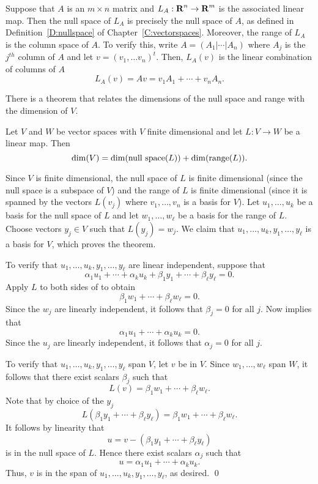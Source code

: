 Suppose that $A$ is an $m\times n$ matrix and $L_A:\mbox{$\bf{R}$}^n\to\mbox{$\bf{R}$}^m$ is the
associated linear map.  Then the null space of $L_A$ is precisely the null
space of $A$, as defined in Definition~\ref{D:nullspace} of 
Chapter~\ref{C:vectorspaces}.  Moreover, the range of $L_A$ is the column 
space of $A$.  To verify this, write $A=(A_1|\cdots|A_n)$ where $A_j$ is the 
$j^{th}$ column of $A$ and let $v=(v_1,\ldots v_n)^t$.  Then, $L_A(v)$ is the 
linear combination of columns of $A$
\[
L_A(v)=Av = v_1A_1+\cdots+v_nA_n.
\]

There is a theorem that relates the dimensions of the null space and range
with the dimension of $V$.
\begin{thm}  \label{T:nsr}
Let $V$ and $W$ be vector spaces with $V$ finite dimensional and let
$L:V\to W$ be a linear map.  Then
\[
\dim(V) = \dim(\mbox{\rm null space}(L)) + \dim({\rm range}(L)).
\] 
\end{thm}

\proof   Since $V$ is finite dimensional, the null space of $L$ is finite 
dimensional (since the null space is a subspace of $V$) and the range of $L$ 
is finite dimensional (since it is spanned by the vectors $L(v_j)$ where 
$v_1,\ldots,v_n$ is a basis for $V$).  Let $u_1,\ldots,u_k$ be a basis for 
the null space of $L$ and let $w_1,\ldots,w_\ell$ be a basis for the range of
$L$.   Choose vectors $y_j\in V$ such that $L(y_j)=w_j$.  We claim that
$u_1,\ldots,u_k,y_1,\ldots,y_\ell$ is a basis for $V$, which proves the
theorem.

To verify that $u_1,\ldots,u_k,y_1,\ldots,y_\ell$ are linear independent,
suppose that
\begin{equation}  \label{E:uy}
\alpha_1u_1+\cdots+\alpha_ku_k+\beta_1y_1+\cdots+\beta_\ell y_\ell = 0.
\end{equation}
Apply $L$ to both sides of  to obtain
\[
\beta_1w_1+\cdots+\beta_\ell w_\ell = 0.
\]
Since the $w_j$ are linearly independent, it follows that $\beta_j=0$ for all
$j$.  Now   implies that
\[
\alpha_1u_1+\cdots+\alpha_ku_k = 0.
\]
Since the $u_j$ are linearly independent, it follows that $\alpha_j=0$ for
all $j$.

To verify that $u_1,\ldots,u_k,y_1,\ldots,y_\ell$ span $V$, let $v$ be in
$V$.  Since $w_1,\ldots,w_\ell$ span $W$, it follows that there exist scalars
$\beta_j$ such that
\[
L(v) = \beta_1w_1+\cdots+\beta_\ell w_\ell.
\]
Note that by choice of the $y_j$
\[
L(\beta_1y_1+\cdots+\beta_\ell y_\ell) = \beta_1w_1+\cdots+\beta_\ell w_\ell.
\]
It follows by linearity that
\[
u = v - (\beta_1y_1+\cdots+\beta_\ell y_\ell)
\]
is in the null space of $L$.  Hence there exist scalars $\alpha_j$ such that
\[
u = \alpha_1u_1+\cdots+\alpha_ku_k.
\]
Thus, $v$ is in the span of $u_1,\ldots,u_k,y_1,\ldots,y_\ell$, as desired.
\qed

